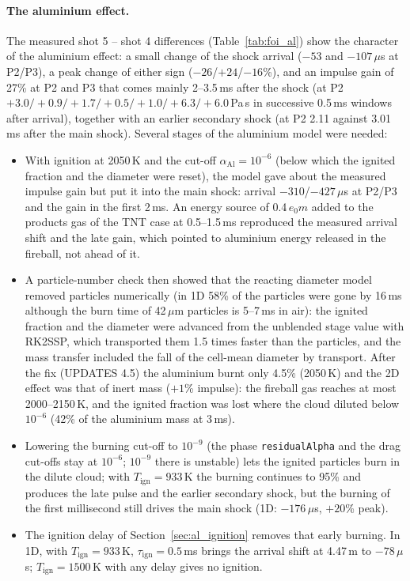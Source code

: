 \documentclass{article}
\begin{document}
\paragraph{The aluminium effect.} The measured shot 5 -- shot 4 differences (Table~\ref{tab:foi_al}) show the character of the aluminium effect: a small change of the shock arrival ($-53$ and $-107$\,$\mu$s at P2/P3), a peak change of either sign ($-26$/$+24$/$-16$\%), and an impulse gain of 27\% at P2 and P3 that comes mainly 2--3.5\,ms after the shock (at P2 $+3.0/+0.9/+1.7/+0.5/+1.0/+6.3/+6.0$\,Pa\,s in successive 0.5\,ms windows after arrival), together with an earlier secondary shock (at P2 2.11 against 3.01\,ms after the main shock). Several stages of the aluminium model were needed:
\begin{itemize}
    \item With ignition at 2050\,K and the cut-off $\alpha_\text{Al} = 10^{-6}$ (below which the ignited fraction and the diameter were reset), the model gave about the measured impulse gain but put it into the main shock: arrival $-310$/$-427$\,$\mu$s at P2/P3 and the gain in the first 2\,ms. An energy source of 0.4\,$e_0 m$ added to the products gas of the TNT case at 0.5--1.5\,ms reproduced the measured arrival shift and the late gain, which pointed to aluminium energy released in the fireball, not ahead of it.
    \item A particle-number check then showed that the reacting diameter model removed particles numerically (in 1D 58\% of the particles were gone by 16\,ms although the burn time of 42\,$\mu$m particles is 5--7\,ms in air): the ignited fraction and the diameter were advanced from the unblended stage value with RK2SSP, which transported them 1.5 times faster than the particles, and the mass transfer included the fall of the cell-mean diameter by transport. After the fix (UPDATES 4.5) the aluminium burnt only 4.5\% (2050\,K) and the 2D effect was that of inert mass ($+1$\% impulse): the fireball gas reaches at most 2000--2150\,K, and the ignited fraction was lost where the cloud diluted below $10^{-6}$ (42\% of the aluminium mass at 3\,ms).
    \item Lowering the burning cut-off to $10^{-9}$ (the phase \texttt{residualAlpha} and the drag cut-offs stay at $10^{-6}$; $10^{-9}$ there is unstable) lets the ignited particles burn in the dilute cloud; with $T_\text{ign} = 933$\,K the burning continues to 95\% and produces the late pulse and the earlier secondary shock, but the burning of the first millisecond still drives the main shock (1D: $-176$\,$\mu$s, $+20$\% peak).
    \item The ignition delay of Section~\ref{sec:al_ignition} removes that early burning. In 1D, with $T_\text{ign} = 933$\,K, $\tau_\text{ign} = 0.5$\,ms brings the arrival shift at 4.47\,m to $-78$\,$\mu$s; $T_\text{ign} = 1500$\,K with any delay gives no ignition.
\end{itemize}
\end{document}
